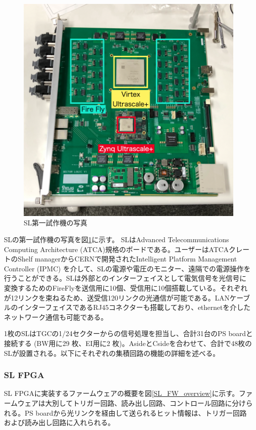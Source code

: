 \begin{figure} 
    \centering
    \includegraphics[width=16cm]{fig/Intro/TGC_SL.jpg}
    \caption[SL第一試作機の写真]{SL第一試作機の写真}
    \label{TGC_SL}
\end{figure}

SLの第一試作機の写真を図\ref{TGC_SL}に示す。
SLはAdvanced Telecommunications Computing Architecture (ATCA)規格のボードである。ユーザーはATCAクレートのShelf managerからCERNで開発されたIntelligent Platform Management Controller  (IPMC) を介して、SLの電源や電圧のモニター、遠隔での電源操作を行うことができる。SLは外部とのインターフェイスとして電気信号を光信号に変換するためのFireFlyを送信用に10個、受信用に10個搭載している。それぞれが12リンクを束ねるため、送受信120リンクの光通信が可能である。LANケーブルのインターフェイスであるRJ45コネクターも搭載しており、ethernetを介したネットワーク通信も可能である。

1枚のSLはTGCの1/24セクターからの信号処理を担当し、合計31台のPS boardと接続する (BW用に29 枚、EI用に2 枚)。AsideとCsideを合わせて、合計で48枚のSLが設置される。以下にそれぞれの集積回路の機能の詳細を述べる。

    \subsubsection{SL FPGA}
SL FPGAに実装するファームウェアの概要を図\ref{SL_FW_overview}に示す。ファームウェアは大別してトリガー回路、読み出し回路、コントロール回路に分けられる。PS boardから光リンクを経由して送られるヒット情報は、トリガー回路および読み出し回路に入れられる。

